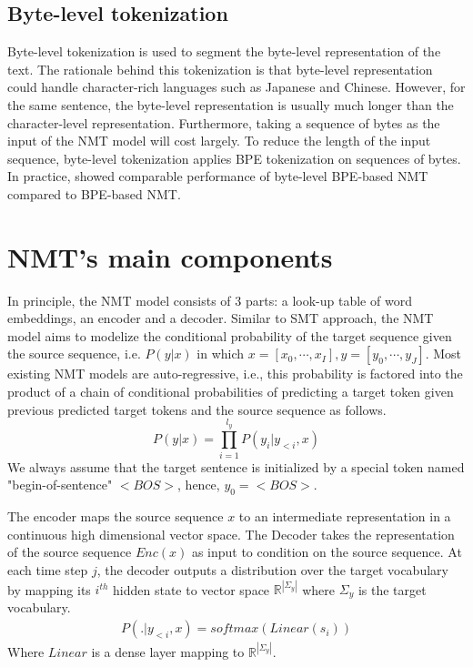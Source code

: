 \subsection{Byte-level tokenization}
Byte-level tokenization is used to segment the byte-level representation of the text. The rationale behind this tokenization is that byte-level representation could handle character-rich languages such as Japanese and Chinese. However, for the same sentence, the byte-level representation is usually much longer than the character-level representation. Furthermore, taking a sequence of bytes as the input of the NMT model will cost largely. To reduce the length of the input sequence, byte-level tokenization applies BPE tokenization on sequences of bytes. In practice, \cite{Wang19neural} showed comparable performance of byte-level BPE-based NMT compared to BPE-based NMT. 
\section{NMT's main components}
In principle, the NMT model consists of 3 parts: a look-up table of word embeddings, an encoder and a decoder. Similar to SMT approach, the NMT model aims to modelize the conditional probability of the target sequence given the source sequence, i.e. $P(y|x)$ in which $x=[x_0,\cdots,x_{I}], y=[y_0,\cdots,y_{J}]$. Most existing NMT models are auto-regressive, i.e., this probability is factored into the product of a chain of conditional probabilities of predicting a target token given previous predicted target tokens and the source sequence as follows.
\begin{equation}
P(y|x) = \displaystyle{\mathop{\prod}_{i=1}^{l_y}} P(y_i|y_{<i},x)
\end{equation}
We always assume that the target sentence is initialized by a special token named "begin-of-sentence" $<BOS>$, hence, $y_{0}=<BOS>$. 

The encoder maps the source sequence $x$ to an intermediate representation in a continuous high dimensional vector space. The Decoder takes the representation of the source sequence $Enc(x)$ as input to condition on the source sequence. At each time step $j$, the decoder outputs a distribution over the target vocabulary by mapping its $i^{th}$ hidden state to vector space $\mathbb{R}^{|\Sigma_y|}$ where $\Sigma_y$ is the target vocabulary.
\begin{equation}
\begin{array}{rcl}
P(.|y_{<i},x) = softmax(Linear(s_i))
\end{array}
\end{equation}
Where $Linear$ is a dense layer mapping to $\mathbb{R}^{|\Sigma_y|}$.

